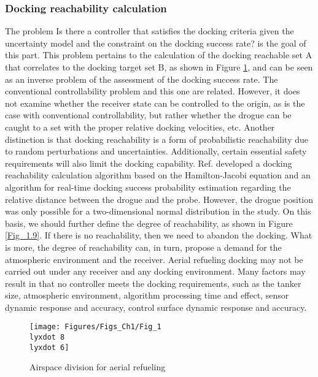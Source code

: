 \subsubsection{Docking reachability calculation}

The problem \textquotedbl Is there a controller that satisfies the
docking criteria given the uncertainty model and the constraint on
the docking success rate?\textquotedbl{} is the goal of this part.
This problem pertains to the calculation of the docking reachable
set A that correlates to the docking target set B, as shown in Figure
\ref{Fig_1.8-6}, and can be seen as an inverse problem of the assessment
of the docking success rate. The conventional controllability problem
and this one are related. However, it does not examine whether the
receiver state can be controlled to the origin, as is the case with
conventional controllability, but rather whether the drogue can be
caught to a set with the proper relative docking velocities, etc.
Another distinction is that docking reachability is a form of probabilistic
reachability due to random perturbations and uncertainties. Additionally,
certain essential safety requirements will also limit the docking
capability. Ref.\cite{wang2019towards} developed a docking reachability
calculation algorithm based on the Hamilton-Jacobi equation and an
algorithm for real-time docking success probability estimation regarding
the relative distance between the drogue and the probe. However, the
drogue position was only possible for a two-dimensional normal distribution
in the study. On this basis, we should further define the degree of
reachability, as shown in Figure \ref{Fig_1.9}. If there is no reachability,
then we need to abandon the docking. What is more, the degree of reachability
can, in turn, propose a demand for the atmospheric environment and
the receiver. Aerial refueling docking may not be carried out under
any receiver and any docking environment. Many factors may result
in that no controller meets the docking requirements, such as the
tanker size, atmospheric environment, algorithm processing time and
effect, sensor dynamic response and accuracy, control surface dynamic
response and accuracy. 

\begin{figure}
\begin{centering}
\texttt{[image: Figures/Figs\_Ch1/Fig\_1\\lyxdot 8\\lyxdot 6]}
\par\end{centering}
\caption{Airspace division for aerial refueling}

\centering{}\label{Fig_1.8-6}
\end{figure}

